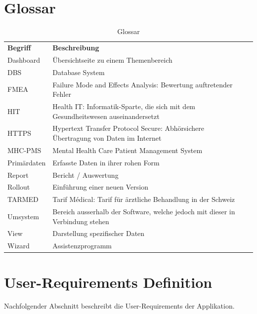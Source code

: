 \documentclass[a4paper]{scrreprt}
\begin{document}
\chapter{Glossar}
\begin{table}[h]
\label{tab_glossar}
\begin{tabular}{llll}
{\textbf{Begriff}} 	& {\textbf{Beschreibung}} \\

Dashboard			& Übersichtseite zu einem Themenbereich \\
DBS 				& Database System \\
FMEA 				& Failure Mode and Effects Analysis: Bewertung auftretender Fehler \\
HIT 				& Health IT: Informatik-Sparte, die sich mit dem Gesundheitswesen auseinandersetzt \\
HTTPS 				& Hypertext Transfer Protocol Secure: Abhörsichere Übertragung von Daten im Internet \\
MHC-PMS 			& Mental Health Care Patient Management System \\
Primärdaten			& Erfasste Daten in ihrer rohen Form \\
Report				& Bericht / Auswertung \\
Rollout				& Einführung einer neuen Version \\
TARMED				& Tarif Médical: Tarif für ärztliche Behandlung in der Schweiz \\
Umsystem			& Bereich ausserhalb der Software, welche jedoch mit dieser in Verbindung stehen \\
View				& Darstellung spezifischer Daten \\
Wizard				& Assistenzprogramm \\


\end{tabular}
\caption[Glossar]{Glossar}
\end{table}




\chapter{User-Requirements Definition}
Nachfolgender Abschnitt beschreibt die User-Requirements der Applikation.
\end{document}
